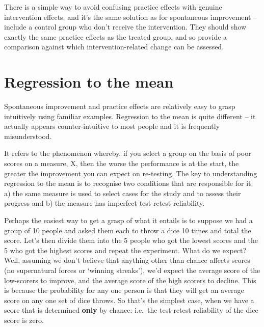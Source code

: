 \documentclass[]{book}
\begin{document}
There is a simple way to avoid confusing practice effects with genuine intervention effects, and it's the same solution as for spontaneous improvement -- include a control group who don't receive the intervention. They should show exactly the same practice effects as the treated group, and so provide a comparison against which intervention-related change can be assessed.

\hypertarget{regression-to-the-mean}{%
\section{Regression to the mean}\label{regression-to-the-mean}}

Spontaneous improvement and practice effects are relatively easy to grasp intuitively using familiar examples. Regression to the mean is quite different -- it actually appears counter-intuitive to most people and it is frequently misunderstood.

It refers to the phenomenon whereby, if you select a group on the basis of poor scores on a measure, X, then the worse the performance is at the start, the greater the improvement you can expect on re-testing. The key to understanding regression to the mean is to recognise two conditions that are responsible for it: a) the same measure is used to select cases for the study and to assess their progress and b) the measure has imperfect test-retest reliability.

Perhaps the easiest way to get a grasp of what it entails is to suppose we had a group of 10 people and asked them each to throw a dice 10 times and total the score. Let's then divide them into the 5 people who got the lowest scores and the 5 who got the highest scores and repeat the experiment. What do we expect? Well, assuming we don't believe that anything other than chance affects scores (no supernatural forces or `winning streaks'), we'd expect the average score of the low-scorers to improve, and the average score of the high scorers to decline. This is because the probability for any one person is that they will get an average score on any one set of dice throws. So that's the simplest case, when we have a score that is determined \textbf{only} by chance: i.e.~the test-retest reliability of the dice score is zero.
\end{document}
